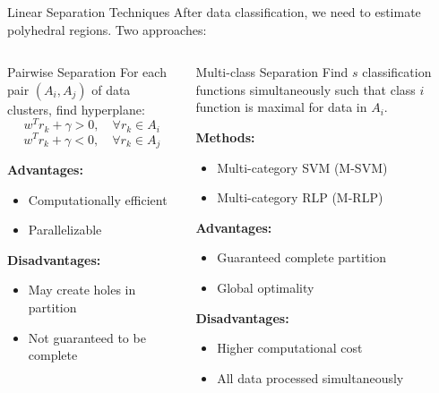 \documentclass[aspectratio=169]{beamer}
\begin{document}
\begin{frame}{Linear Separation Techniques}
After data classification, we need to estimate polyhedral regions. Two approaches:

\begin{columns}[t]
\begin{column}{0.5\textwidth}
\begin{block}{Pairwise Separation}
For each pair $(A_i, A_j)$ of data clusters, find hyperplane:
$$w^T r_k + \gamma > 0, \quad \forall r_k \in A_i$$
$$w^T r_k + \gamma < 0, \quad \forall r_k \in A_j$$

\textbf{Advantages:}
\begin{itemize}
\item Computationally efficient
\item Parallelizable
\end{itemize}

\textbf{Disadvantages:}
\begin{itemize}
\item May create holes in partition
\item Not guaranteed to be complete
\end{itemize}
\end{block}
\end{column}
\begin{column}{0.5\textwidth}
\begin{block}{Multi-class Separation}
Find $s$ classification functions simultaneously such that class $i$ function is maximal for data in $A_i$.

\textbf{Methods:}
\begin{itemize}
\item Multi-category SVM (M-SVM) \cite{cortes1995support}
\item Multi-category RLP (M-RLP) \cite{bennett1992robust}
\end{itemize}

\textbf{Advantages:}
\begin{itemize}
\item Guaranteed complete partition
\item Global optimality
\end{itemize}

\textbf{Disadvantages:}
\begin{itemize}
\item Higher computational cost
\item All data processed simultaneously
\end{itemize}
\end{block}
\end{column}
\end{columns}
\end{frame}
\end{document}
